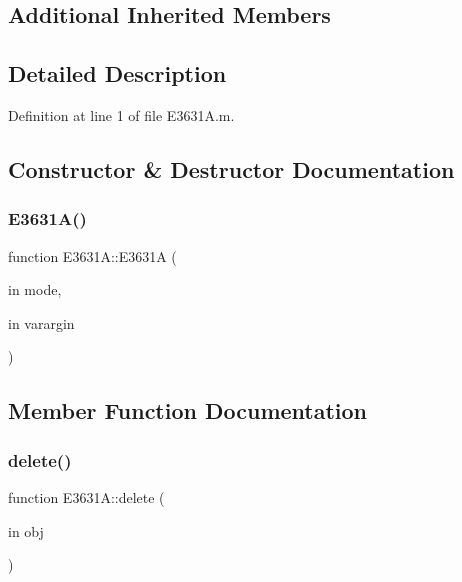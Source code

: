 \subsection*{Additional Inherited Members}


\subsection{Detailed Description}


Definition at line 1 of file E3631\+A.\+m.



\subsection{Constructor \& Destructor Documentation}
\mbox{\label{class_e3631_a_a1a783dbbf6a3daf9565a4a50edf20826}} 
\subsubsection{\texorpdfstring{E3631\+A()}{E3631A()}}
{\footnotesize\ttfamily function E3631\+A\+::\+E3631A (\begin{DoxyParamCaption}\item[{in}]{mode,  }\item[{in}]{varargin }\end{DoxyParamCaption})}



\subsection{Member Function Documentation}
\mbox{\label{class_e3631_a_aaf82ff5dbf7ecf8170f57563e9844901}} 
\subsubsection{\texorpdfstring{delete()}{delete()}}
{\footnotesize\ttfamily function E3631\+A\+::delete (\begin{DoxyParamCaption}\item[{in}]{obj }\end{DoxyParamCaption})}

\mbox{\label{class_e3631_a_a8fc8a942a60d0fbffb8baa25f0c342a6}} 
